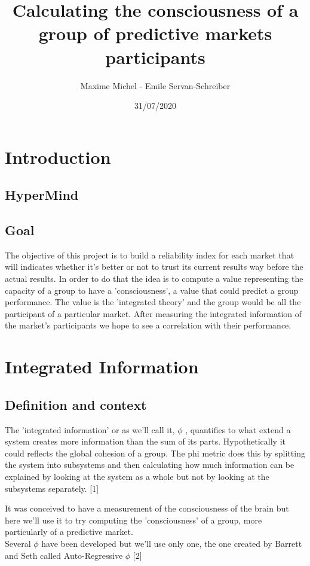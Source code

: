 \documentclass{report}
\title{Calculating the consciousness of a group of predictive markets participants}
\author{Maxime Michel - Emile Servan-Schreiber}
\date{31/07/2020}
\begin{document}
 
\maketitle


\chapter{Introduction}
\section{HyperMind}
\section{Goal}

The objective of this project is to build a reliability index for each market that will indicates whether it's better or not to trust its current results way before the actual results. In order to do that the idea is to compute a value representing the capacity of a group to have a 'consciousness', a value that could predict a group performance. The value is the 'integrated theory' and the group would be all the participant of a particular market. After measuring the integrated information of the market's participants we hope to see a correlation with their performance.

\chapter{Integrated Information}
\section{Definition and context}

The 'integrated information' or as we'll call it, $\phi $ , quantifies to what extend a system creates more information than the sum of its parts. Hypothetically it could reflects the global cohesion of a group. The phi metric does this by splitting the system into subsystems and then calculating how much information can be explained by looking at the system as a whole but not by looking at the subsystems separately. [1]

It was conceived to have a measurement of the consciousness of the brain but here we'll use it to try computing the 'consciousness' of a group, more particularly of a predictive market.\\

Several $\phi $ have been developed but we'll use only one, the one created by Barrett and Seth called Auto-Regressive $\phi $ [2]
\end{document}
